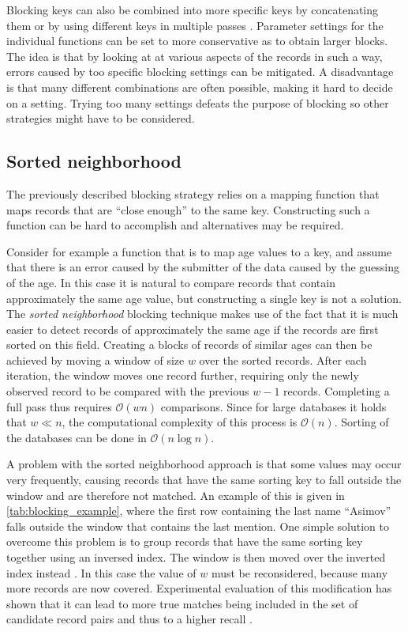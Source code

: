 Blocking keys can also be combined into more specific keys by concatenating them \citep{Christen2012} or by using different keys in multiple passes \citep{Baxter2003}.
Parameter settings for the individual functions can be set to more conservative as to obtain larger blocks.
The idea is that by looking at at various aspects of the records in such a way, errors caused by too specific blocking settings can be mitigated.
A disadvantage is that many different combinations are often possible, making it hard to decide on a setting.
Trying too many settings defeats the purpose of blocking so other strategies might have to be considered.




\subsection{Sorted neighborhood}
\label{sec:sorted_neighborhood}

The previously described blocking strategy relies on a mapping function that maps records that are ``close enough'' to the same key.
Constructing such a function can be hard to accomplish and alternatives may be required.

Consider for example a function that is to map age values to a key, and assume that there is an error caused by the submitter of the data caused by the guessing of the age.
In this case it is natural to compare records that contain approximately the same age value, but constructing a single key is not a solution.
The \emph{sorted neighborhood} blocking technique \citep{Hernandez1995} makes use of the fact that it is much easier to detect records of approximately the same age if the records are first sorted on this field.
Creating a blocks of records of similar ages can then be achieved by moving a window of size $w$ over the sorted records.
After each iteration, the window moves one record further, requiring only the newly observed record to be compared with the previous $w-1$ records.
Completing a full pass thus requires $\mathcal{O}(wn)$ comparisons.
Since for large databases it holds that $w \ll n$, the computational complexity of this process is $\mathcal{O}(n)$.
Sorting of the databases can be done in $\mathcal{O}(n \log n)$.

A problem with the sorted neighborhood approach is that some values may occur very frequently, causing records that have the same sorting key to fall outside the window and are therefore not matched.
An example of this is given in \cref{tab:blocking_example}, where the first row containing the last name ``Asimov'' falls outside the window that contains the last mention.
One simple solution to overcome this problem is to group records that have the same sorting key together using an inversed index.
The window is then moved over the inverted index instead \citep{Christen2012}.
In this case the value of $w$ must be reconsidered, because many more records are now covered.
Experimental evaluation of this modification has shown that it can lead to more true matches being included in the set of candidate record pairs and thus to a higher recall \citep{Christen2012}.

